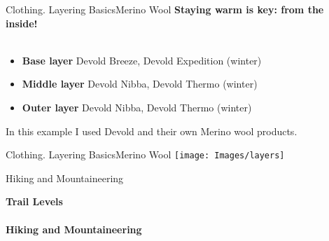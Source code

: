\documentclass[xcolor=dvipsnames,aspectratio=1610]{beamer}
\begin{document}
\begin{frame}{Clothing. Layering Basics}{Merino Wool}
\LARGE
\textbf{Staying warm is key: from the inside!}\\~\\
\Large
\begin{itemize}
    \item \textbf{Base layer} Devold Breeze, Devold Expedition (winter)
    \item \textbf{Middle layer} Devold Nibba, Devold Thermo (winter)
    \item \textbf{Outer layer} Devold Nibba, Devold Thermo (winter)
\end{itemize}
In this example I used Devold and their own Merino wool products.
\end{frame}


\begin{frame}{Clothing. Layering Basics}{Merino Wool}
\texttt{[image: Images/layers]}
\end{frame}


\begin{frame}{Hiking and Mountaineering}{}
\begin{center}
\Huge \textbf{Trail Levels}\\~\\
\Huge \textbf{Hiking and Mountaineering}
\end{center}
\end{frame}

\begin{frame}
\end{frame}
\end{document}
